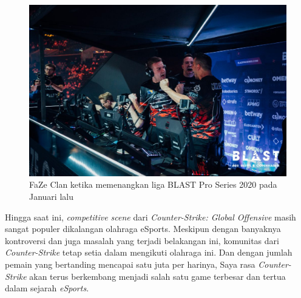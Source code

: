\documentclass[12pt]{article}
\begin{document}
    \begin{figure}[H]
    \centering
    \includegraphics[width=1.0\textwidth]{images/20191102_Adela-Sznajder_BLASTProSeriesCPH_04183-1024x683.jpg}
    \caption{FaZe Clan ketika memenangkan liga BLAST Pro Series 2020 pada
    Januari lalu}
    \end{figure}

    Hingga saat ini, \emph{competitive scene} dari \emph{Counter-Strike:
    Global Offensive} masih sangat populer dikalangan olahraga eSports.
    Meskipun dengan banyaknya kontroversi dan juga masalah yang terjadi
    belakangan ini, komunitas dari \emph{Counter-Strike} tetap setia dalam
    mengikuti olahraga ini. Dan dengan jumlah pemain yang bertanding
    mencapai satu juta per harinya, Saya rasa \emph{Counter-Strike} akan
    terus berkembang menjadi salah satu game terbesar dan tertua dalam
    sejarah \emph{eSports}.
\end{document}
